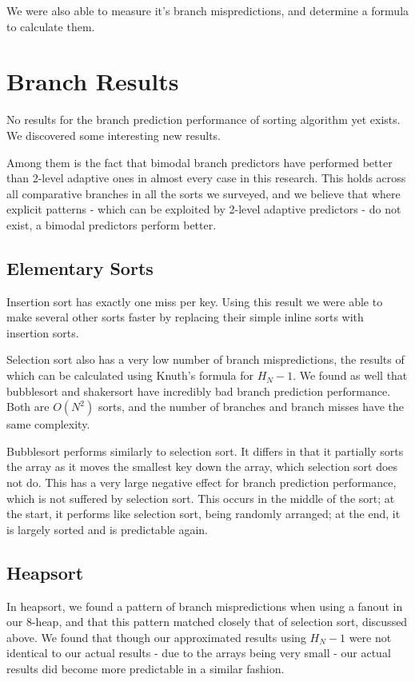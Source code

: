 We were also able to measure it's branch mispredictions, and determine a formula
to calculate them.




\section{Branch Results}


No results for the branch prediction performance of sorting algorithm yet
exists. We discovered some interesting new results. 

Among them is the fact that bimodal branch predictors have performed better than
2-level adaptive ones in almost every case in this research. This holds across
all comparative branches in all the sorts we surveyed, and we believe that where
explicit patterns - which can be exploited by 2-level adaptive predictors - do
not exist, a bimodal predictors perform better.


\subsection{Elementary Sorts}

Insertion sort has exactly one miss per key. Using this result we were able to
make several other sorts faster by replacing their simple inline sorts with
insertion sorts.

Selection sort also has a very low number of branch mispredictions, the results
of which can be calculated using Knuth's formula for $H_N-1$. We found as well
that bubblesort and shakersort have incredibly bad branch prediction
performance. Both are $O(N^2)$ sorts, and the number of branches and branch
misses have the same complexity.

Bubblesort performs similarly to selection sort. It differs in that it partially
sorts the array as it moves the smallest key down the array, which selection sort
does not do. This has a very large negative effect for branch prediction
performance, which is not suffered by selection sort. This occurs in the middle
of the sort; at the start, it performs like selection sort, being randomly
arranged; at the end, it is largely sorted and is predictable again.

\subsection{Heapsort}

In heapsort, we found a pattern of branch mispredictions when using a fanout in
our 8-heap, and that this pattern matched closely that of selection sort,
discussed above. We found that though our approximated results using $H_N-1$
were not identical to our actual results - due to the arrays being very small -
our actual results did become more predictable in a similar fashion.

